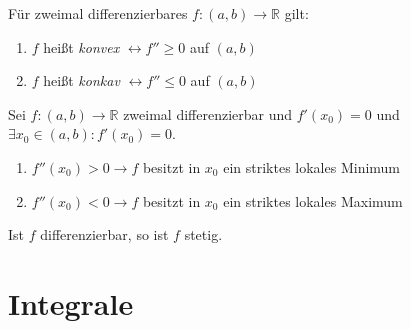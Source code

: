 \documentclass[]{article}
\begin{document}
\begin{definition}
	Für zweimal differenzierbares $f : (a,b) \rightarrow \mathbb{R}$ gilt:
	\begin{enumerate}[noitemsep]
		\item $f$ heißt \emph{konvex} $\leftrightarrow f'' \geq 0$ auf $(a,b)$
		\item $f$ heißt \emph{konkav} $\leftrightarrow f'' \leq 0$ auf $(a,b)$		
	\end{enumerate}
\end{definition}

\begin{satz}
	Sei $f : (a,b) \rightarrow \mathbb{R}$ zweimal differenzierbar und $f'(x_0)=0$ und $\exists x_0 \in (a,b) : f'(x_0) = 0$.
	
	\begin{enumerate}[noitemsep]
		\item $f''(x_0) > 0 \rightarrow f$ besitzt in $x_0$ ein striktes lokales Minimum
		\item $f''(x_0) < 0 \rightarrow f$ besitzt in $x_0$ ein striktes lokales Maximum	
	\end{enumerate}
\end{satz}

\begin{satz}
	Ist $f$ differenzierbar, so ist $f$ stetig.
\end{satz}

\section{Integrale}
\end{document}
